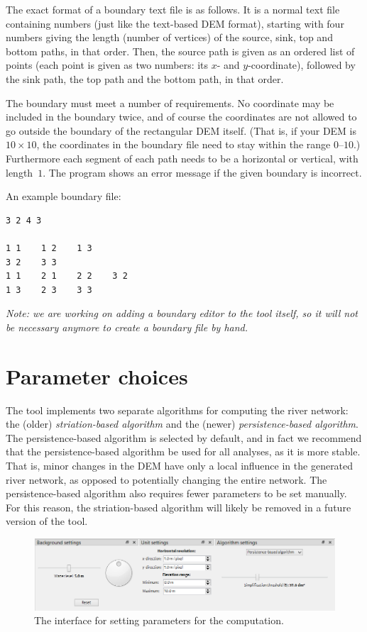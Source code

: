 \documentclass{article}
\begin{document}
The exact format of a boundary text file is as follows. It is a normal text file containing numbers (just like the text-based DEM format), starting with four numbers giving the length (number of vertices) of the source, sink, top and bottom paths, in that order. Then, the source path is given as an ordered list of points (each point is given as two numbers: its $x$- and $y$-coordinate), followed by the sink path, the top path and the bottom path, in that order.

The boundary must meet a number of requirements. No coordinate may be included in the boundary twice, and of course the coordinates are not allowed to go outside the boundary of the rectangular DEM itself. (That is, if your DEM is $10 \times 10$, the coordinates in the boundary file need to stay within the range $0$--$10$.) Furthermore each segment of each path needs to be a horizontal or vertical, with length~$1$. The program shows an error message if the given boundary is incorrect.

An example boundary file:
\begin{verbatim}
3 2 4 3

1 1    1 2    1 3
3 2    3 3
1 1    2 1    2 2    3 2
1 3    2 3    3 3
\end{verbatim}

\emph{Note: we are working on adding a boundary editor to the tool itself, so it will not be necessary anymore to create a boundary file by hand.}


\section{Parameter choices}
\label{sec:parameters}

The tool implements two separate algorithms for computing the river network: the (older) \emph{striation-based algorithm} and the (newer) \emph{persistence-based algorithm}. The persistence-based algorithm is selected by default, and in fact we recommend that the persistence-based algorithm be used for all analyses, as it is more stable. That is, minor changes in the DEM have only a local influence in the generated river network, as opposed to potentially changing the entire network. The persistence-based algorithm also requires fewer parameters to be set manually. For this reason, the striation-based algorithm will likely be removed in a future version of the tool.

\begin{figure}
    \centering
    \includegraphics[width=\linewidth]{figures/parameters.png}
    \caption{The interface for setting parameters for the computation.}
    \label{fig:parameters}
\end{figure}
\end{document}
